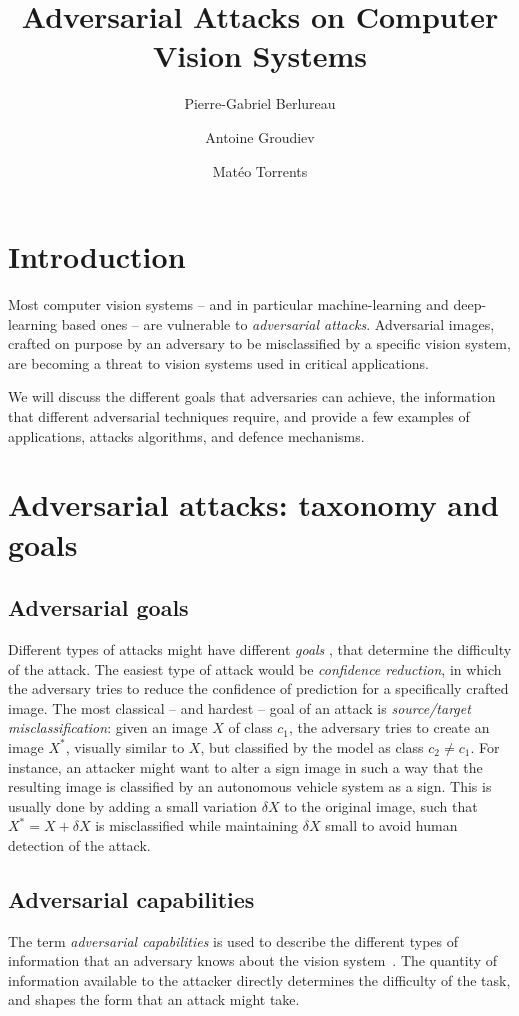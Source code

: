 \documentclass[twocolumn]{../../cs-classes/cs-classes}
\title{Adversarial Attacks on Computer Vision Systems}
\author{Pierre-Gabriel Berlureau\and Antoine Groudiev\and Matéo Torrents}
\date{}
\begin{document}
\maketitle
\section{Introduction}
Most computer vision systems -- and in particular machine-learning and deep-learning based ones -- are vulnerable to \emph{adversarial attacks}. Adversarial images, crafted on purpose by an adversary to be misclassified by a specific vision system, are becoming a threat to vision systems used in critical applications.

We will discuss the different goals that adversaries can achieve, the information that different adversarial techniques require, and provide a few examples of applications, attacks algorithms, and defence mechanisms.

\section{Adversarial attacks: taxonomy and goals}
%
\subsection{Adversarial goals}
Different types of attacks might have different \emph{goals} \cite{chakraborty2021survey}, that determine the difficulty of the attack. The easiest type of attack would be \emph{confidence reduction}, in which the adversary tries to reduce the
confidence of prediction for a specifically crafted image. The most classical -- and hardest -- goal of an attack is \emph{source/target misclassification}: given an image $X$ of class $c_1$, the adversary tries to create an image $X^*$, visually similar to $X$, but classified by the model as class $c_2\neq c_1$. For instance, an attacker might want to alter a  sign image in such a way that the resulting image is classified by an autonomous vehicle system as a  sign. This is usually done by adding a small variation $\delta X$ to the original image, such that $X^*=X+\delta X$ is misclassified while maintaining $\delta X$ small to avoid human detection of the attack.

\subsection{Adversarial capabilities}
The term \emph{adversarial capabilities} is used to describe the different types of information that an adversary knows about the vision system \cite{chakraborty2021survey}. The quantity of information available to the attacker directly determines the difficulty of the task, and shapes the form that an attack might take.
\end{document}
